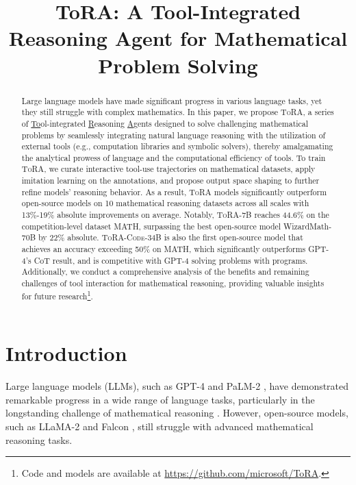 \title{ToRA: A Tool-Integrated Reasoning Agent for Mathematical Problem Solving}

\begin{abstract}
Large language models have made significant progress in various language tasks, yet they still struggle with complex mathematics. In this paper, we propose \textsc{ToRA}, a series of \underline{To}ol-integrated \underline{R}easoning \underline{A}gents designed to solve challenging mathematical problems by seamlessly integrating natural language reasoning with the utilization of external tools (e.g., computation libraries and symbolic solvers), thereby amalgamating the analytical prowess of language and the computational efficiency of tools. To train \textsc{ToRA}, we curate interactive tool-use trajectories on mathematical datasets, apply imitation learning on the annotations, and propose output space shaping to further refine models' reasoning behavior. As a result, \textsc{ToRA} models significantly outperform open-source models on 10 mathematical reasoning datasets across all scales with 13\%-19\% absolute improvements on average. Notably, \textsc{ToRA}-7B reaches 44.6\% on the competition-level dataset MATH, surpassing the best open-source model WizardMath-70B by 22\% absolute.
\textsc{ToRA-Code}-34B is also the first open-source model that achieves an accuracy exceeding 50\% on MATH, which significantly outperforms GPT-4's CoT result, and is competitive with GPT-4 solving problems with programs. Additionally, we conduct a comprehensive analysis of the benefits and remaining challenges of tool interaction for mathematical reasoning, providing valuable insights for future research\footnote{Code and models are available at \url{https://github.com/microsoft/ToRA}.}.
\end{abstract}

\section{Introduction}

Large language models (LLMs), such as GPT-4 \citep{openai2023gpt4} and PaLM-2 \citep{anil2023palm}, have demonstrated remarkable progress in a wide range of language tasks, particularly in the longstanding challenge of mathematical reasoning \citep{feigenbaum1963computers, hosseini2014learning}. However, open-source models, such as LLaMA-2 \citep{touvron2023LLaMA, llama2} and Falcon \citep{refinedweb}, still struggle with advanced mathematical reasoning tasks. 

